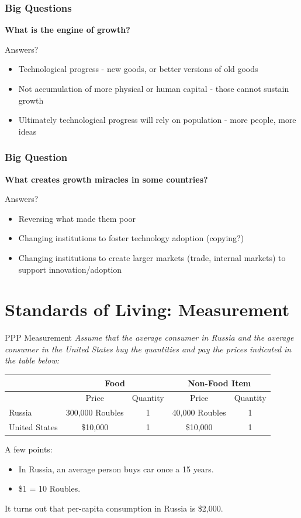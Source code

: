 \documentclass[shownotes,11pt, aspectratio=169]{beamer}
\begin{document}
\begin{frame}
\frametitle{Big Questions}
\textbf{What is the engine of growth?}

\vspace{.25in}\noindent Answers?
\begin{itemize}
	\item Technological progress - new goods, or better versions of old goods
	\item Not accumulation of more physical or human capital - those cannot sustain growth
	\item Ultimately technological progress will rely on population - more people, more ideas
\end{itemize}
\end{frame}


\begin{frame}
\frametitle{Big Question}
\textbf{What creates growth miracles in some countries?}

\vspace{.25in}\noindent Answers?
\begin{itemize}
	\item Reversing what made them poor
	\item Changing institutions to foster technology adoption (copying?)
	\item Changing institutions to create larger markets (trade, internal markets) to support innovation/adoption
\end{itemize}
\end{frame}

\section{Standards of Living: Measurement}

\begin{frame}{PPP Measurement}
\textit{Assume that the average consumer in Russia and the average consumer in the United States buy the quantities and pay the prices indicated in the table below:} 
\\
    \begin{center}
    \begin{tabular}{lcccc}
       \hline 
        ~             & \multicolumn{2}{c}{Food}        & \multicolumn{2}{c}{Non-Food Item}       \\ \hline
        ~             & Price & Quantity & Price                   & Quantity \\ 
        Russia        & 300,000 Roubles     & 1      &  40,000 Roubles                    & 1      \\ 
        United States & \$10,000     & 1     & \$10,000                       & 1     \\ \hline
    \end{tabular}
    \end{center}
A few points:
\begin{itemize}
\item In Russia, an average person buys car once a 15 years.
\item \$1 = 10 Roubles.
\end{itemize}    
It turns out that per-capita consumption in Russia is \$2,000.
\end{frame}
\end{document}
